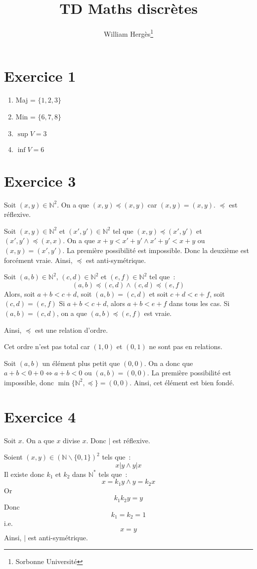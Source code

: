 \documentclass[a4paper]{article}
\title{TD Maths discrètes}
\author{William Hergès\thanks{Sorbonne Université}}
\begin{document}
	\maketitle
    \section*{Exercice 1}
    \begin{enumerate}
        \item Maj = $\{1,2,3\}$
        \item Min = $\{6,7,8\}$
        \item $\sup V = 3$
        \item $\inf V = 6$
    \end{enumerate}
    \section*{Exercice 3}
    Soit $(x,y)\in \mathbb{N}^2$.
    On a que $(x,y)\preceq(x,y)$ car $(x,y)=(x,y)$.
    $\preceq$ est réflexive.

    Soit $(x,y)\in\mathbb{N}^2$ et $(x',y')\in\mathbb{N}^2$ tel que $(x,y)\preceq (x',y')$ et $(x',y')\preceq (x,x)$.
    On a que $x+y < x'+y' \land x'+y' < x+y$ ou $(x,y)=(x',y')$.
    La première possibilité est impossible.
    Donc la deuxième est forcément vraie.
    Ainsi, $\preceq$ est anti-symétrique.

    Soit $(a,b)\in\mathbb{N}^2$, $(c,d)\in\mathbb{N}^2$ et $(e,f)\in\mathbb{N}^2$ tel que~:
    $$ (a,b)\preceq (c,d)\land (c,d)\preceq (e,f) $$
    Alors, soit $a+b < c+d$, soit $(a,b) = (c,d)$ et soit $c+d<e+f$, soit $(c,d)=(e,f)$
    Si $a+b < c+d$, alors $a+b < e+f$ dans tous les cas.
    Si $(a,b) = (c,d)$, on a que $(a,b)\preceq (e,f)$ est vraie.

    Ainsi, $\preceq$ est une relation d'ordre.

    Cet ordre n'est pas total car $(1,0)$ et $(0,1)$ ne sont pas en relations.

    Soit $(a,b)$ un élément plus petit que $(0,0)$.
    On a donc que $a+b < 0+0 \iff a + b < 0$ ou $(a,b)=(0,0)$.
    La première possibilité est impossible, donc $\min\{\mathbb{N}^2,\preceq\} = (0,0)$.
    Ainsi, cet élément est bien fondé.
    \section*{Exercice 4}
    Soit $x$. On a que $x$ divise $x$. Donc $|$ est réflexive.

    Soient $(x,y)\in(\mathbb{N}\backslash\{0,1\})^2$ tels que~: $$ x | y \land y | x $$
    Il existe donc $k_1$ et $k_2$ dans $\mathbb{N}^*$ tels que~: $$ x = k_1y \land y = k_2x $$
    Or $$ k_1k_2y = y $$
    Donc $$ k_1=k_2=1 $$
    i.e. $$ x = y $$
    Ainsi, $|$ est anti-symétrique.
\end{document}
